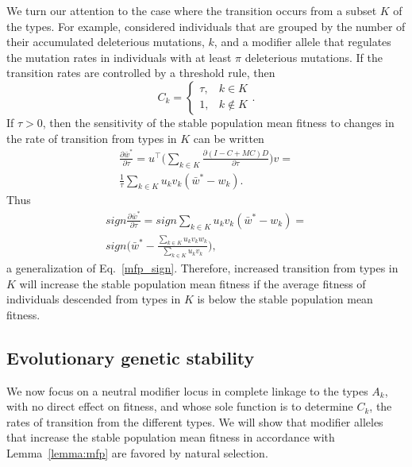 \documentclass[9pt, a4paper, twocolumn]{extarticle}
\newcommand*{\tr}{^\intercal}
\begin{document}
We turn our attention to the case where the transition occurs from a subset $K$ of the types.
For example, \citet[Appendix~B]{Ram2012} considered individuals that are grouped by the number of their accumulated deleterious mutations, $k$, 
and a modifier allele that regulates the mutation rates in individuals with at least $\pi$ deleterious mutations.
If the transition rates are controlled by a threshold rule, then 
\begin{equation}
C_k = \begin{cases}
\tau, & k \in K \\
1, & k \not\in K
\end{cases}.
\end{equation}
If $\tau > 0$, then the sensitivity of the stable population mean fitness to changes in the
rate of transition from types in $K$ can be written 
\begin{equation}
\begin{aligned}
\frac{\partial \bar{w}^*}{\partial \tau} = 
u\tr \Big( \sum_{k \in K}{\frac{\partial (I - C + MC)D}{\partial \tau}} \Big) v = \\
\frac{1}{\tau} \sum_{k \in K}{u_k v_k (\bar{w}^* - w_k)}.
\end{aligned}
\end{equation}
Thus
\begin{multline}\label{mfp_sign_threshold}
sign \frac{\partial \bar{w}^*}{\partial \tau} = 
sign \sum_{k \in K}{u_k v_k (\bar{w}^* - w_k)} = \\ 
sign \Big(\bar{w}^* - \frac{\sum_{k \in K}{u_k v_k w_k}}{\sum_{k \in K}{u_k v_k}}\Big), 
\end{multline}
a generalization of Eq.~\ref{mfp_sign}.
Therefore, increased transition from types in $K$ will increase the stable population mean fitness if the average fitness of individuals descended from types in $K$ is below the stable population mean fitness.

\subsection*{Evolutionary genetic stability}

We now focus on a neutral modifier locus in complete linkage to the types $A_k$, with no direct effect on fitness, and whose sole function is to determine $C_k$, the rates of transition from the different types.
We will show that modifier alleles that increase the stable population mean fitness in accordance with Lemma~\ref{lemma:mfp} are favored by natural selection.
\end{document}

